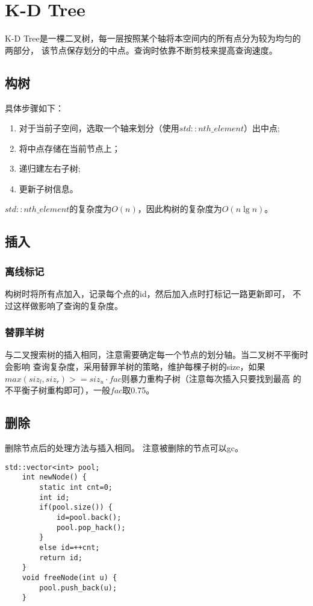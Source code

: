 \section{K-D Tree}
K-D Tree是一棵二叉树，每一层按照某个轴将本空间内的所有点分为较为均匀的两部分，
该节点保存划分的中点。查询时依靠不断剪枝来提高查询速度。
\subsection{构树}
具体步骤如下：
\begin{enumerate}
	\item 对于当前子空间，选取一个轴来划分（使用$std::nth\_element$）出中点;
	\item 将中点存储在当前节点上；
	\item 递归建左右子树;
	\item 更新子树信息。
\end{enumerate}
$std::nth\_element$的复杂度为$O(n)$，因此构树的复杂度为$O(n\lg n)$。
\subsection{插入}
\subsubsection{离线标记}
构树时将所有点加入，记录每个点的id，然后加入点时打标记一路更新即可，
不过这样做影响了查询的复杂度。
\subsubsection{替罪羊树}
与二叉搜索树的插入相同，注意需要确定每一个节点的划分轴。当二叉树不平衡时会影响
查询复杂度，采用替罪羊树的策略，维护每棵子树的size，如果
$max(siz_l,siz_r)>=siz_u \cdot fac$则暴力重构子树（注意每次插入只要找到最高
的不平衡子树重构即可），一般$fac$取0.75。
\subsection{删除}
删除节点后的处理方法与插入相同。
注意被删除的节点可以gc。

\begin{lstlisting}[title=gc]
    std::vector<int> pool;
    int newNode() {
        static int cnt=0;
        int id;
        if(pool.size()) {
            id=pool.back();
            pool.pop_hack();
        }
        else id=++cnt;
        return id;
    }
    void freeNode(int u) {
        pool.push_back(u);
    }
\end{lstlisting}

